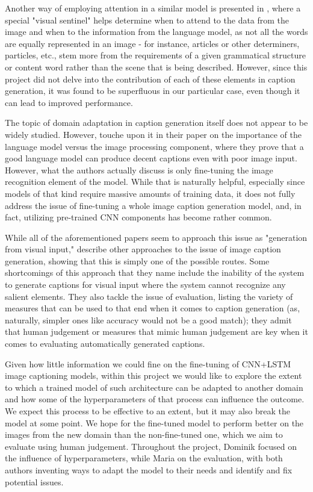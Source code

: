 \documentclass[11pt]{article}
\begin{document}
Another way of employing attention in a similar model is presented in \cite{lu16}, where a special "visual sentinel" helps determine when to attend to the data from the image and when to the information from the language model, as not all the words are equally represented in an image - for instance, articles or other determiners, particles, etc., stem more from the requirements of a given grammatical structure or content word rather than the scene that is being described. However, since this project did not delve into the contribution of each of these elements in caption generation, it was found to be superfluous in our particular case, even though it can lead to improved performance.

The topic of domain adaptation in caption generation itself does not appear to be widely studied. However, \cite{hesselSW15} touche upon it in their paper on the importance of the language model versus the image processing component, where they prove that a good language model can produce decent captions even with poor image input. However, what the authors actually discuss is only fine-tuning the image recognition element of the model. While that is naturally helpful, especially since models of that kind require massive amounts of training data, it does not fully address the issue of fine-tuning a whole image caption generation model, and, in fact, utilizing pre-trained CNN components has become rather common.

While all of the aforementioned papers seem to approach this issue as "generation from visual input," \cite{bernardi16} describe other approaches to the issue of image caption generation, showing that this is simply one of the possible routes. Some shortcomings of this approach that they name include the inability of the system to generate captions for visual input where the system cannot recognize any salient elements. They also tackle the issue of evaluation, listing the variety of measures that can be used to that end when it comes to caption generation (as, naturally, simpler ones like accuracy would not be a good match); they admit that human judgement or measures that mimic human judgement are key when it comes to evaluating automatically generated captions.

Given how little information we could fine on the fine-tuning of CNN+LSTM image captioning models, within this project we would like to explore the extent to which a trained model of such architecture can be adapted to another domain and how some of the hyperparameters of that process can influence the outcome. We expect this process to be effective to an extent, but it may also break the model at some point. We hope for the fine-tuned model to perform better on the images from the new domain than the non-fine-tuned one, which we aim to evaluate using human judgement. Throughout the project, Dominik focused on the influence of hyperparameters, while Maria on the evaluation, with both authors inventing ways to adapt the model to their needs and identify and fix potential issues.
\end{document}
